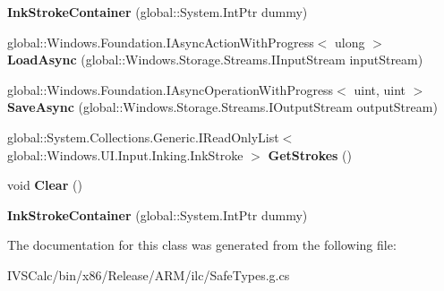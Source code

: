 \begin{DoxyCompactItemize}
{\bfseries Ink\+Stroke\+Container} (global\+::\+System.\+Int\+Ptr dummy)
\item 
\mbox{\label{class_windows_1_1_u_i_1_1_input_1_1_inking_1_1_ink_stroke_container_a5616ede4fa36b0beea0b9be54c099ebb}} 
global\+::\+Windows.\+Foundation.\+I\+Async\+Action\+With\+Progress$<$ ulong $>$ {\bfseries Load\+Async} (global\+::\+Windows.\+Storage.\+Streams.\+I\+Input\+Stream input\+Stream)
\item 
\mbox{\label{class_windows_1_1_u_i_1_1_input_1_1_inking_1_1_ink_stroke_container_a40e4584e1273ad7c496cac055b5d57c9}} 
global\+::\+Windows.\+Foundation.\+I\+Async\+Operation\+With\+Progress$<$ uint, uint $>$ {\bfseries Save\+Async} (global\+::\+Windows.\+Storage.\+Streams.\+I\+Output\+Stream output\+Stream)
\item 
\mbox{\label{class_windows_1_1_u_i_1_1_input_1_1_inking_1_1_ink_stroke_container_af781d5c3e0bfb7e61a701f947102de1a}} 
global\+::\+System.\+Collections.\+Generic.\+I\+Read\+Only\+List$<$ global\+::\+Windows.\+U\+I.\+Input.\+Inking.\+Ink\+Stroke $>$ {\bfseries Get\+Strokes} ()
\item 
\mbox{\label{class_windows_1_1_u_i_1_1_input_1_1_inking_1_1_ink_stroke_container_a30539b293749d997f25488d7f6192d11}} 
void {\bfseries Clear} ()
\item 
\mbox{\label{class_windows_1_1_u_i_1_1_input_1_1_inking_1_1_ink_stroke_container_af018db7df39dc27906b9daad9fb6597c}} 
{\bfseries Ink\+Stroke\+Container} (global\+::\+System.\+Int\+Ptr dummy)
\end{DoxyCompactItemize}


The documentation for this class was generated from the following file\+:\begin{DoxyCompactItemize}
\item 
I\+V\+S\+Calc/bin/x86/\+Release/\+A\+R\+M/ilc/Safe\+Types.\+g.\+cs\end{DoxyCompactItemize}
